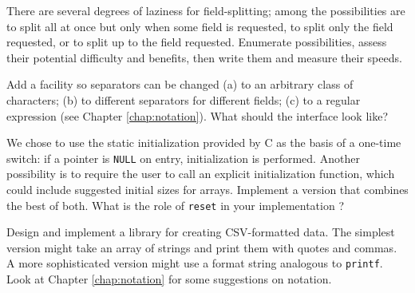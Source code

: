 \begin{exercise}
    There are several degrees of laziness for field-splitting; among the
    possibilities are to split all at once but only when some field is
    requested, to split only the field requested, or to split up to the
    field requested. Enumerate possibilities, assess their potential
    difficulty and benefits, then write them and measure their speeds.
\end{exercise}

\begin{exercise}
    Add a facility so separators can be changed (a) to an arbitrary class
    of characters; (b) to different separators for different fields; (c) to
    a regular expression (see Chapter \ref{chap:notation}). What should the
    interface look like?
\end{exercise}

\begin{exercise}
    We chose to use the static initialization provided by C as the basis of
    a one-time switch: if a pointer is \verb'NULL' on entry, initialization
    is performed. Another possibility is to require the user to call an
    explicit initialization function, which could include suggested initial
    sizes for arrays. Implement a version that combines the best of both.
    What is the role of \verb'reset' in your implementation ?
\end{exercise}

\begin{exercise}
    Design and implement a library for creating CSV-formatted data. The
    simplest version might take an array of strings and print them with
    quotes and commas. A more sophisticated version might use a format
    string analogous to \verb'printf'.  Look at Chapter \ref{chap:notation}
    for some suggestions on notation.
\end{exercise}
